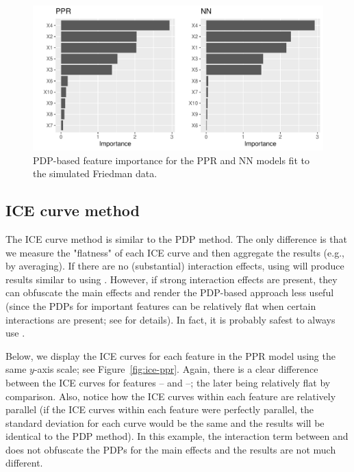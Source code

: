 \begin{figure}[!htb]
  \centering 
  \includegraphics[width=1\linewidth]{figures/vip-ppr-nn} 
  \caption{PDP-based feature importance for the PPR and NN models fit to the simulated Friedman data.}
  \label{fig:pdp-ppr-nn}
\end{figure}


\subsection{ICE curve method}

The ICE curve method is similar to the PDP method. The only difference is that we measure the "flatness" of each ICE curve and then aggregate the results (e.g., by averaging). If there are no (substantial) interaction effects, using  will produce results similar to using . However, if strong interaction effects are present, they can obfuscate the main effects and render the PDP-based approach less useful (since the PDPs for important features can be relatively flat when certain interactions are present; see \citet{goldstein-peeking-2015} for details). In fact, it is probably safest to always use .

Below, we display the ICE curves for each feature in the PPR model using the same $y$-axis scale; see Figure~\ref{fig:ice-ppr}. Again, there is a clear difference between the ICE curves for features -- and --; the later being relatively flat by comparison. Also, notice how the ICE curves within each feature are relatively parallel (if the ICE curves within each feature were perfectly parallel, the standard deviation for each curve would be the same and the results will be identical to the PDP method). In this example, the interaction term between  and  does not obfuscate the PDPs for the main effects and the results are not much different.


